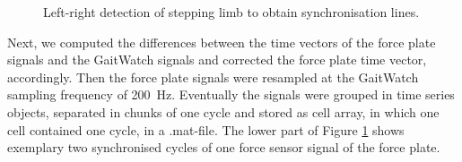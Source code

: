 \begin{figure}
	\centering
	\caption{Left-right detection of stepping limb to obtain synchronisation lines.}
	\label{fig:left_right_detect}
\end{figure}

  Next, we computed the differences between the time vectors of the force plate signals and the GaitWatch signals and corrected the force plate time vector, accordingly. Then the force plate signals were resampled at the GaitWatch sampling frequency of \mbox{200 Hz}. Eventually the signals were grouped in time series objects, separated in chunks of one cycle and stored as cell array, in which one cell contained one cycle, in a .mat-file. The lower part of Figure \ref{fig:left_right_detect} shows exemplary two synchronised cycles of one force sensor signal of the force plate.
 

